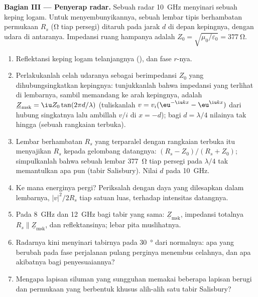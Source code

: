\begin{problem}
\medskip
\noindent\textbf{Bagian III --- Penyerap radar.}
Sebuah radar \qty{10}{GHz} menyinari sebuah keping logam. Untuk menyembunyikannya, sebuah lembar
tipis berhambatan permukaan $R_s$ (\unit{\ohm} tiap persegi)
ditaruh pada jarak $d$ di depan kepingnya, dengan udara di antaranya.
Impedansi ruang hampanya adalah $Z_0 = \sqrt{\mu_0/\varepsilon_0} = \qty{377}{\ohm}$.
\begin{enumerate}[resume]
  \item Reflektansi keping logam telanjangnya (), dan
        fase $r$-nya.
  \item Perlakukanlah celah udaranya sebagai  berimpedansi $Z_0$
        yang dihubungsingkatkan kepingnya: tunjukkanlah bahwa impedansi yang terlihat di
        lembarnya, sambil memandang ke arah kepingnya, adalah $\underline Z_{\text{msk}} = \iu Z_0
        \tan(2\pi d/\lambda)$ (tuliskanlah  $v = v_i(\eu^{-\iu kx} -
        \eu^{\iu kx})$ dari hubung singkatnya lalu ambillah $v/i$ di $x = -d$); bagi $d =
        \lambda/4$ nilainya tak hingga (sebuah rangkaian terbuka).
  \item Lembar berhambatan $R_s$ yang terparalel dengan rangkaian terbuka
        itu menyajikan $R_s$ kepada gelombang datangnya:  $(R_s - Z_0)/(R_s + Z_0)$; simpulkanlah bahwa sebuah lembar
        \qty{377}{\ohm} tiap persegi pada $\lambda/4$ tak memantulkan apa pun (tabir
        Salisbury). Nilai $d$ pada \qty{10}{GHz}.
  \item Ke mana energinya pergi? Periksalah dengan daya yang dilesapkan
        dalam lembarnya, $|v|^2/2R_s$ tiap satuan luas, terhadap intensitas
        datangnya.
  \item Pada \qty{8}{GHz} dan \qty{12}{GHz} bagi tabir yang sama: $\underline Z_{\text{msk}}$,
        impedansi totalnya $R_s \parallel \underline Z_{\text{msk}}$, dan
        reflektansinya; lebar pita muslihatnya.
  \item Radarnya kini menyinari tabirnya pada \qty{30}{\degree} dari
        normalnya: apa yang berubah pada fase perjalanan pulang perginya
        menembus celahnya, dan apa akibatnya bagi penyesuaiannya?
  \item Mengapa lapisan siluman yang sungguhan memakai beberapa lapisan berugi
        dan permukaan yang berbentuk khusus alih-alih satu tabir Salisbury?
\end{enumerate}


\end{problem}
